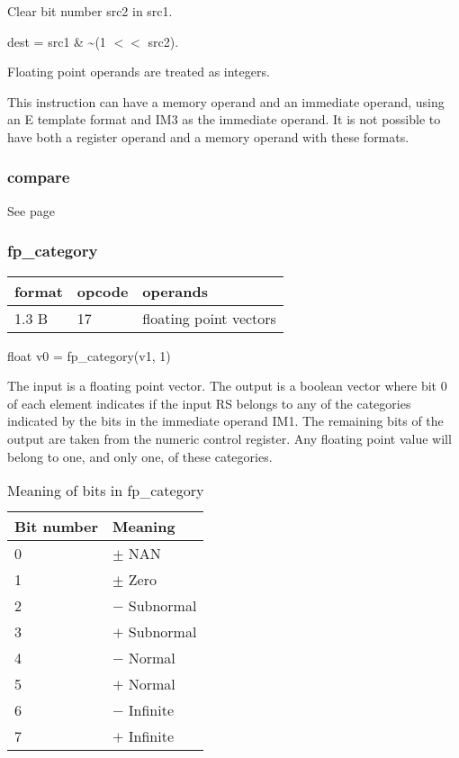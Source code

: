 \documentclass[forwardcom.tex]{subfiles}
\begin{document}
Clear bit number src2 in src1.
\vspace{2mm}

dest = src1 \& \~{}(1 $<<$ src2).

\vspace{2mm}
Floating point operands are treated as integers.

\vspace{2mm}
This instruction can have a memory operand and an immediate operand, using an E template format and IM3  as the immediate operand. It is not possible to have both a register operand and a memory operand with these formats.
\vspace{2mm}

\subsubsection{compare}
See page \pageref{table:compareInstruction}
\vspace{2mm}

\subsubsection{fp\_category}
\label{table:fpCategoryInstruction}
\begin{tabular}{|p{12mm}|p{12mm}|p{110mm}|}
\hline
\bfseries format & \bfseries opcode & \bfseries operands \\ \hline
1.3 B & 17 & floating point vectors \\ \hline
\end{tabular}
\vspace{2mm}

float v0 = fp\_category(v1, 1)
\vspace{2mm}

The input is a floating point vector. The output is a boolean vector where bit 0 of each element indicates if the input RS belongs to any of the categories indicated by the bits in the immediate operand IM1. The remaining bits of the output are taken from the numeric control register. 
Any floating point value will belong to one, and only one, of these categories. 

\begin{longtable} {|p{20mm}|p{90mm}|}
\caption{Meaning of bits in fp\_category} 
\label{table:fpCategoryInstructionBits} \\
\endfirsthead
\endhead
\hline
\bfseries Bit number & \bfseries Meaning  \\
\hline
0 & $\pm$ NAN \\
1 & $\pm$ Zero \\
2 & $-$ Subnormal \\
3 & $+$ Subnormal \\
4 & $-$ Normal \\
5 & $+$ Normal \\
6 & $-$ Infinite  \\
7 & $+$ Infinite  \\
\hline
\end{longtable}
\end{document}

